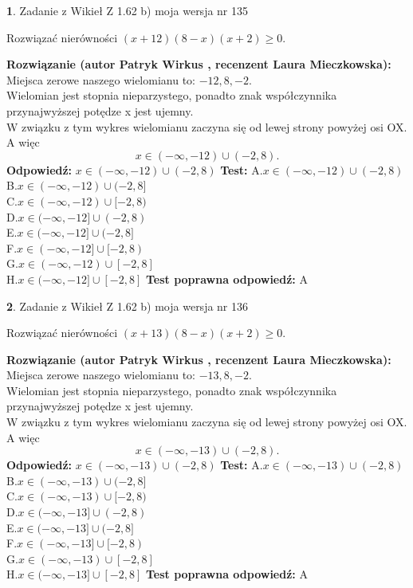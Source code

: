 \documentclass[12pt, a4paper]{article}
\theoremstyle{definition} %
\newtheorem{zad}{}
\newcommand{\zadStart}[1]{\begin{zad}#1\newline}
\newcommand{\zadStop}{\end{zad}}
\newcommand{\rozwStart}[2]{\noindent \textbf{Rozwiązanie (autor #1 , recenzent #2): }\newline}
\newcommand{\rozwStop}{\newline}
\newcommand{\odpStart}{\noindent \textbf{Odpowiedź:}\newline}
\newcommand{\odpStop}{\newline}
\newcommand{\testStart}{\noindent \textbf{Test:}\newline}
\newcommand{\testStop}{\newline}
\newcommand{\kluczStart}{\noindent \textbf{Test poprawna odpowiedź:}\newline}
\newcommand{\kluczStop}{\newline}
\begin{document}
\zadStart{Zadanie z Wikieł Z 1.62 b) moja wersja nr 135}

Rozwiązać nierówności $(x+12)(8-x)(x+2)\ge0$.
\zadStop
\rozwStart{Patryk Wirkus}{Laura Mieczkowska}
Miejsca zerowe naszego wielomianu to: $-12, 8, -2$.\\
Wielomian jest stopnia nieparzystego, ponadto znak współczynnika przy\linebreak najwyższej potędze x jest ujemny.\\ W związku z tym wykres wielomianu zaczyna się od lewej strony powyżej osi OX. A więc $$x \in (-\infty,-12) \cup (-2,8).$$
\rozwStop
\odpStart
$x \in (-\infty,-12) \cup (-2,8)$
\odpStop
\testStart
A.$x \in (-\infty,-12) \cup (-2,8)$\\
B.$x \in (-\infty,-12) \cup (-2,8]$\\
C.$x \in (-\infty,-12) \cup [-2,8)$\\
D.$x \in (-\infty,-12] \cup (-2,8)$\\
E.$x \in (-\infty,-12] \cup (-2,8]$\\
F.$x \in (-\infty,-12] \cup [-2,8)$\\
G.$x \in (-\infty,-12) \cup [-2,8]$\\
H.$x \in (-\infty,-12] \cup [-2,8]$
\testStop
\kluczStart
A
\kluczStop



\zadStart{Zadanie z Wikieł Z 1.62 b) moja wersja nr 136}

Rozwiązać nierówności $(x+13)(8-x)(x+2)\ge0$.
\zadStop
\rozwStart{Patryk Wirkus}{Laura Mieczkowska}
Miejsca zerowe naszego wielomianu to: $-13, 8, -2$.\\
Wielomian jest stopnia nieparzystego, ponadto znak współczynnika przy\linebreak najwyższej potędze x jest ujemny.\\ W związku z tym wykres wielomianu zaczyna się od lewej strony powyżej osi OX. A więc $$x \in (-\infty,-13) \cup (-2,8).$$
\rozwStop
\odpStart
$x \in (-\infty,-13) \cup (-2,8)$
\odpStop
\testStart
A.$x \in (-\infty,-13) \cup (-2,8)$\\
B.$x \in (-\infty,-13) \cup (-2,8]$\\
C.$x \in (-\infty,-13) \cup [-2,8)$\\
D.$x \in (-\infty,-13] \cup (-2,8)$\\
E.$x \in (-\infty,-13] \cup (-2,8]$\\
F.$x \in (-\infty,-13] \cup [-2,8)$\\
G.$x \in (-\infty,-13) \cup [-2,8]$\\
H.$x \in (-\infty,-13] \cup [-2,8]$
\testStop
\kluczStart
A
\kluczStop
\end{document}
